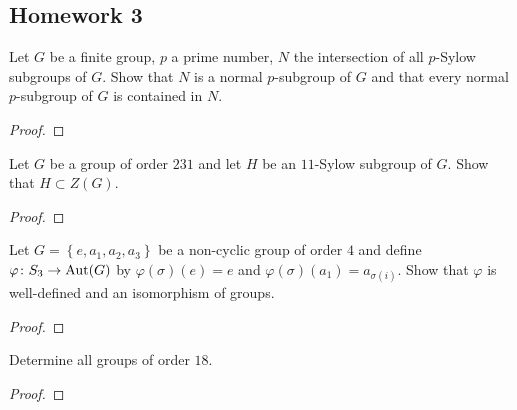 \subsection{Homework 3}
\begin{problem}
Let $G$ be a finite group, $p$ a prime number, $N$ the intersection of all
$p$-Sylow subgroups of $G$. Show that $N$ is a normal $p$-subgroup of $G$
and that every normal $p$-subgroup of $G$ is contained in $N$.
\end{problem}
\begin{proof}
\end{proof}

\begin{problem}
Let $G$ be a group of order $231$ and let $H$ be an $11$-Sylow subgroup of
$G$. Show that $H\subset Z(G)$.
\end{problem}
\begin{proof}
\end{proof}

\begin{problem}
Let $G=\left\{e,a_1,a_2,a_3\right\}$ be a non-cyclic group of order $4$ and
define $\varphi\colon S_3\to\operatorname{Aut}(G)$ by $\varphi(\sigma)(e)=e$ and
$\varphi(\sigma)(a_1)=a_{\sigma(i)}$. Show that $\varphi$ is well-defined and an
isomorphism of groups.
\end{problem}
\begin{proof}
\end{proof}

\begin{problem}
Determine all groups of order $18$.
\end{problem}
\begin{proof}
\end{proof}

